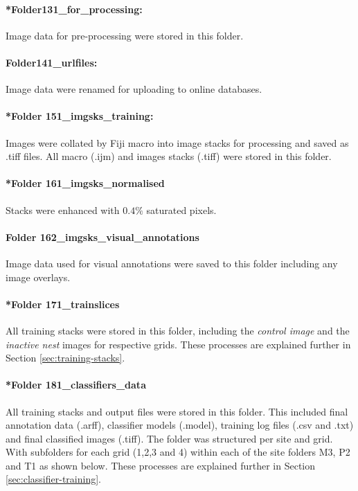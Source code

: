 \paragraph{*Folder131\_for\_processing:} Image data for pre-processing were stored in this folder.

\paragraph{Folder141\_urlfiles:} Image data were renamed for uploading to online databases. 

\paragraph{*Folder 151\_imgsks\_training:} Images were collated by \ac{Fiji} macro into image stacks for processing and saved as .tiff files. All macro (.ijm) and images stacks (.tiff) were stored in this folder.

\paragraph{*Folder 161\_imgsks\_normalised} Stacks were enhanced with $0.4\%$ saturated pixels.

\paragraph{Folder 162\_imgsks\_visual\_annotations} Image data used for visual annotations were saved to this folder including any image overlays.

\paragraph{*Folder 171\_trainslices} All training stacks were stored in this folder, including the \emph{control image} and the \emph{inactive nest} images for respective grids. These processes are explained further in Section \ref{sec:training-stacks}.

\paragraph{*Folder 181\_classifiers\_data} All training stacks and output files were stored in this folder. This included final annotation data (.arff), classifier models (.model), training log files (.csv and .txt) and final classified images (.tiff). The folder was structured per site and grid. With subfolders for each grid (1,2,3 and 4) within each of the site folders M3, P2 and T1 as shown below. These processes are explained further in Section \ref{sec:classifier-training}.

